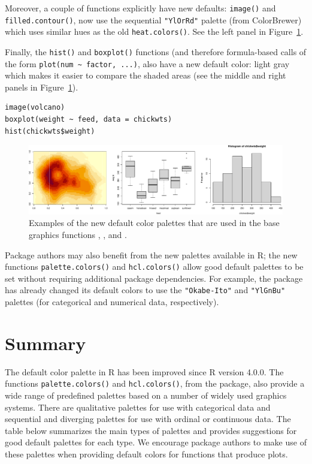 Moreover, a couple of functions explicitly have new defaults:
\texttt{image()} and \texttt{filled.contour()}, now use the sequential \texttt{"YlOrRd"} palette
(from ColorBrewer)
which uses similar hues as the old \texttt{heat.colors()}.
See the left panel in Figure~\ref{fig:graphics}.

Finally, the \texttt{hist()} and \texttt{boxplot()} functions (and therefore
formula-based calls of the form \texttt{plot(num\ \textasciitilde{}\ factor,\ ...)}, also have a new default color:
light gray which makes it easier to compare the shaded areas
(see the middle and right panels in Figure~\ref{fig:graphics}).

\begin{verbatim}
image(volcano)
boxplot(weight ~ feed, data = chickwts)
hist(chickwts$weight)
\end{verbatim}

\begin{figure}[ht!]

{\centering \includegraphics[width=1\linewidth]{color_files/figure-latex/graphics-1} 

}

\caption{Examples of the new default color palettes that are used in the base graphics functions , , and .}\label{fig:graphics}
\end{figure}

Package authors may also benefit from the new palettes available
in R; the new functions \texttt{palette.colors()} and \texttt{hcl.colors()}
allow good default palettes to be set without requiring additional
package dependencies. For example, the  package
has already changed its default colors to use the \texttt{"Okabe-Ito"} and
\texttt{"YlGnBu"} palettes (for categorical and numerical data, respectively).

\hypertarget{sec:summary}{%
\section{Summary}\label{sec:summary}}

The default color palette in R has been improved since R version 4.0.0.
The functions \texttt{palette.colors()} and \texttt{hcl.colors()}, from the
 package, also provide a wide range of predefined
palettes based on a number of widely used graphics systems.
There are qualitative palettes for use with categorical data
and sequential and diverging palettes for use with ordinal or continuous data.
The table below summarizes the main types of palettes and provides
suggestions for good default palettes for each type.
We encourage package authors to make use of these palettes
when providing default colors for functions that produce plots.

